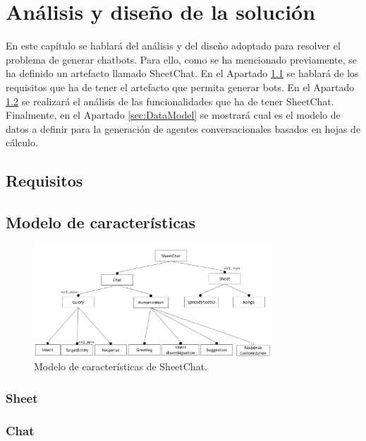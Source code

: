 \chapter{Análisis y diseño de la solución}
\label{cha:AnalysisAndDesign}

En este capítulo se hablará del análisis y del diseño adoptado para resolver el problema de generar chatbots. Para ello, como se ha mencionado previamente, se ha definido un artefacto llamado SheetChat. En el Apartado \ref{sec:Requisitos} se hablará de los requisitos que ha de tener el artefacto que permita generar bots. En el Apartado \ref{sec:FeatureModel} se realizará el análisis de las funcionalidades que ha de tener SheetChat. Finalmente, en el Apartado \ref{sec:DataModel} se mostrará cual es el modelo de datos a definir para la generación de agentes conversacionales basados en hojas de cálculo.

\section{Requisitos}
\label{sec:Requisitos}



\section{Modelo de características}
\label{sec:FeatureModel}

\begin{figure}[htb]
	\centering
	\includegraphics[width=0.8\textwidth]{./figs/FeatureModel.png}
	\caption{Modelo de características de SheetChat.}
	\label{fig:FeatureModel}
\end{figure}

\subsection{Sheet}
\label{sec:Sheet}


\subsection{Chat}
\label{sec:Chat}

